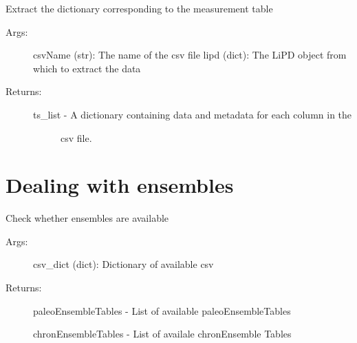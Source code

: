 \documentclass[letterpaper,10pt,english]{sphinxmanual}
\begin{document}

\begin{fulllineitems}
\label{\detokenize{LipdUtils:pyleoclim.LipdUtils.getMeasurement}}
Extract the dictionary corresponding to the measurement table
\begin{description}
\item[{Args:}] \leavevmode
csvName (str): The name of the csv file
lipd (dict): The LiPD object from which to extract the data

\item[{Returns:}] \leavevmode\begin{description}
\item[{ts\_list - A dictionary containing data and metadata for each column in the}] \leavevmode
csv file.

\end{description}

\end{description}

\end{fulllineitems}



\section{Dealing with ensembles}
\label{\detokenize{LipdUtils:dealing-with-ensembles}}

\begin{fulllineitems}
\label{\detokenize{LipdUtils:pyleoclim.LipdUtils.isEnsemble}}
Check whether ensembles are available
\begin{description}
\item[{Args:}] \leavevmode
csv\_dict (dict): Dictionary of available csv

\item[{Returns:}] \leavevmode
paleoEnsembleTables - List of available paleoEnsembleTables

chronEnsembleTables - List of availale chronEnsemble Tables

\end{description}

\end{fulllineitems}
\end{document}
